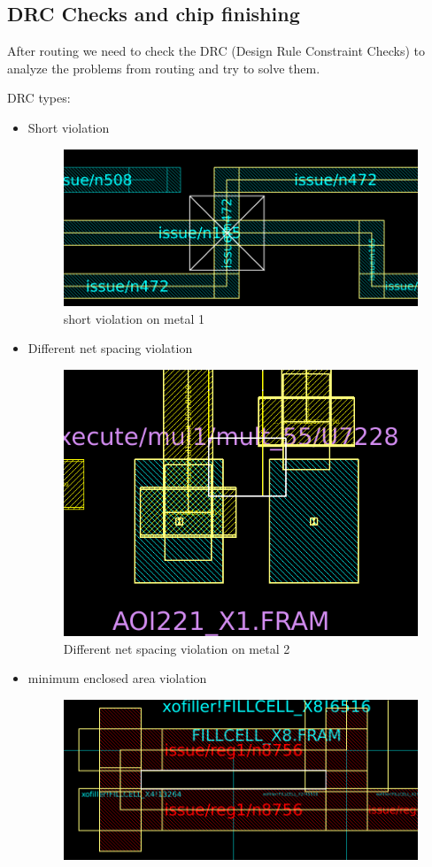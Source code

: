 \documentclass[../main.tex]{subfiles}
\begin{document}
\subsection{DRC Checks and chip finishing}
After routing we need to check the DRC (Design Rule Constraint Checks) to analyze the problems from routing and try to solve them.

DRC types:
\begin{itemize}
    \item Short violation
    \begin{figure}[h]
        \centering
        \includegraphics[width=10 cm]{diagrams/short_violation.png}
        \caption{short violation on metal 1}
        \label{fig:short_violation}
    \end{figure}
    \item Different net spacing violation
    \begin{figure}[h]
        \centering
        \includegraphics[width=10 cm]{diagrams/diff_net_spacing.png}
        \caption{Different net spacing violation on metal 2}
        \label{fig:diff_net_spacing}
    \end{figure}
    \newpage
    \item minimum enclosed area violation
    \begin{figure}[h!]
        \centering
        \includegraphics[width=10 cm]{diagrams/min_area_enclosed.png}

\end{figure}
\end{itemize}
\end{document}
